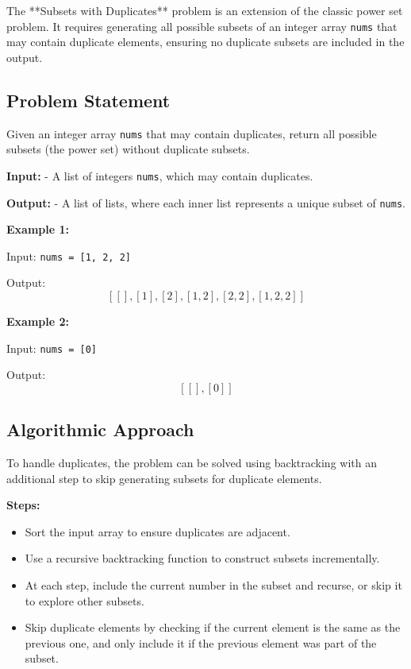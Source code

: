 
\label{problem:Subsets_with_Duplicates}

The **Subsets with Duplicates** problem is an extension of the classic power set problem. It requires generating all possible subsets of an integer array \texttt{nums} that may contain duplicate elements, ensuring no duplicate subsets are included in the output.

\subsection*{Problem Statement}
Given an integer array \texttt{nums} that may contain duplicates, return all possible subsets (the power set) without duplicate subsets.

\textbf{Input:}
- A list of integers \texttt{nums}, which may contain duplicates.

\textbf{Output:}
- A list of lists, where each inner list represents a unique subset of \texttt{nums}.

\textbf{Example 1:}

Input: \texttt{nums = [1, 2, 2]}

Output: \[
\left[
[], [1], [2], [1, 2], [2, 2], [1, 2, 2]
\right]
\]

\textbf{Example 2:}

Input: \texttt{nums = [0]}

Output: \[
\left[
[], [0]
\right]
\]

\subsection*{Algorithmic Approach}
To handle duplicates, the problem can be solved using backtracking with an additional step to skip generating subsets for duplicate elements.

\textbf{Steps:}
\begin{itemize}
    \item Sort the input array to ensure duplicates are adjacent.
    \item Use a recursive backtracking function to construct subsets incrementally.
    \item At each step, include the current number in the subset and recurse, or skip it to explore other subsets.
    \item Skip duplicate elements by checking if the current element is the same as the previous one, and only include it if the previous element was part of the subset.
\end{itemize}


